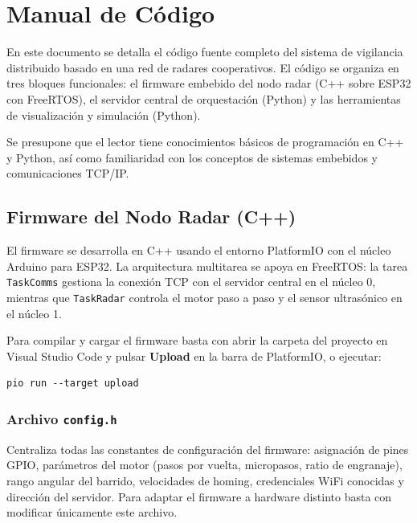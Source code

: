 \chapter{Manual de Código}

En este documento se detalla el código fuente completo del sistema de vigilancia distribuido
basado en una red de radares cooperativos. El código se organiza en tres bloques funcionales:
el firmware embebido del nodo radar (C++ sobre ESP32 con FreeRTOS), el servidor central de
orquestación (Python) y las herramientas de visualización y simulación (Python).

Se presupone que el lector tiene conocimientos básicos de programación en C++ y Python,
así como familiaridad con los conceptos de sistemas embebidos y comunicaciones TCP/IP.

\section{Firmware del Nodo Radar (C++)}

El firmware se desarrolla en C++ usando el entorno PlatformIO con el núcleo Arduino para
ESP32. La arquitectura multitarea se apoya en FreeRTOS: la tarea \texttt{TaskComms}
gestiona la conexión TCP con el servidor central en el núcleo 0, mientras que
\texttt{TaskRadar} controla el motor paso a paso y el sensor ultrasónico en el núcleo 1.

Para compilar y cargar el firmware basta con abrir la carpeta del proyecto en Visual Studio
Code y pulsar \textbf{Upload} en la barra de PlatformIO, o ejecutar:

\begin{lstlisting}[style=Consola]
pio run --target upload
\end{lstlisting}

\subsection{Archivo \texttt{config.h}}

Centraliza todas las constantes de configuración del firmware: asignación de pines GPIO,
parámetros del motor (pasos por vuelta, micropasos, ratio de engranaje), rango angular del
barrido, velocidades de homing, credenciales WiFi conocidas y dirección del servidor. Para
adaptar el firmware a hardware distinto basta con modificar únicamente este archivo.

